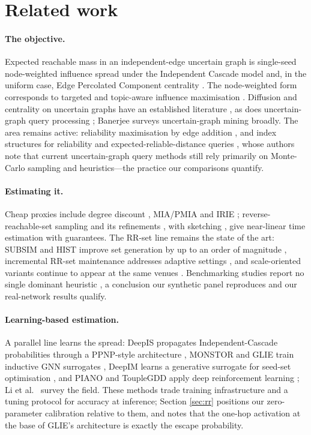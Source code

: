 \documentclass[11pt,a4paper]{article}
\begin{document}
\section{Related work}

\paragraph{The objective.} Expected reachable mass in an independent-edge
uncertain graph is single-seed node-weighted influence spread under the
Independent Cascade model \cite{kkt03} and, in the uniform case, Edge Percolated
Component centrality \cite{hubba08,cytohubba14}. The node-weighted form
corresponds to targeted and topic-aware influence maximisation
\cite{kbtim15,topicaware14}. Diffusion and centrality on uncertain graphs have
an established literature \cite{pfeiffer11,ceccarello17}, as does uncertain-graph
query processing \cite{potamias10,jin11}; Banerjee \cite{banerjee22} surveys
uncertain-graph mining broadly. The area remains active: reliability
maximisation by edge addition \cite{ke22}, and index structures for
reliability and expected-reliable-distance queries \cite{wang24}, whose
authors note that current uncertain-graph query methods still rely primarily
on Monte-Carlo sampling and heuristics---the practice our comparisons
quantify.

\paragraph{Estimating it.} Cheap proxies include degree discount
\cite{degdisc09}, MIA/PMIA \cite{pmia10} and IRIE \cite{irie12};
reverse-reachable-set sampling \cite{borgs14} and its refinements
\cite{tim14,imm15}, with sketching \cite{skim14}, give near-linear time
estimation with guarantees. The RR-set line remains the state of the art:
SUBSIM and HIST improve set generation by up to an order of magnitude
\cite{guo20,guo22}, incremental RR-set maintenance addresses adaptive
settings \cite{guo23}, and scale-oriented variants continue to appear at the
same venues \cite{feng23}. Benchmarking studies report no single dominant
heuristic \cite{arora17,ohsaka20}, a conclusion our synthetic panel
reproduces and our real-network results qualify.

\paragraph{Learning-based estimation.} A parallel line learns the spread:
DeepIS propagates Independent-Cascade probabilities through a PPNP-style
architecture \cite{deepis21}, MONSTOR and GLIE train inductive GNN
surrogates \cite{monstor20,glie23}, DeepIM learns a generative surrogate for
seed-set optimisation \cite{ling23,chowdhury24}, and PIANO and ToupleGDD
apply deep reinforcement learning \cite{piano23,touplegdd24}; Li et al.\
\cite{li23survey} survey the field. These methods trade training
infrastructure and a tuning protocol for accuracy at inference; Section
\ref{sec:rr} positions our zero-parameter calibration relative to them, and
notes that the one-hop activation at the base of GLIE's architecture is
exactly the escape probability.
\end{document}
